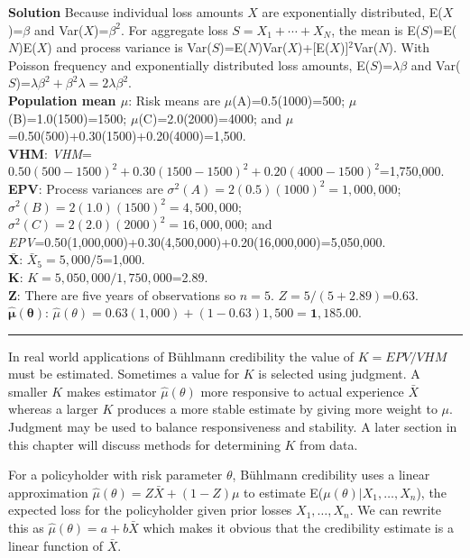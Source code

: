 \documentclass[]{book}
\theoremstyle{definition}
\theoremstyle{definition}
\theoremstyle{definition}
\theoremstyle{remark}
\begin{document}
\hypertarget{toggleExampleCred.3.5}{}
\textbf{Solution} Because individual loss amounts \(X\) are
exponentially distributed, E(\(X\))=\(\beta\) and
Var(\(X\))=\(\beta^2\). For aggregate loss \(S=X_1+\cdots+X_N\), the
mean is E(\(S\))=E(\(N\))E(\(X\)) and process variance is
Var(\(S\))=E(\(N\))Var(\(X\))+{[}E(\(X\)){]}\(^2\)Var(\(N\)). With
Poisson frequency and exponentially distributed loss amounts,
E(\(S\))=\(\lambda\beta\) and
Var(\(S\))=\(\lambda\beta^2+\beta^2\lambda=2\lambda\beta^2\).\\
\textbf{Population mean \(\mu\)}: Risk means are
\(\mu\)(A)=0.5(1000)=500; \(\mu\)(B)=1.0(1500)=1500;
\(\mu\)(C)=2.0(2000)=4000; and
\(\mu\)=0.50(500)+0.30(1500)+0.20(4000)=1,500.\\
\textbf{VHM}:
\emph{VHM}=\(0.50(500-1500)^2+0.30(1500-1500)^2+0.20(4000-1500)^2\)=1,750,000.\\
\textbf{EPV}: Process variances are
\(\sigma^2(A)=2(0.5)(1000)^2=1,000,000\);
\(\sigma^2(B)=2(1.0)(1500)^2=4,500,000\);
\(\sigma^2(C)=2(2.0)(2000)^2=16,000,000\); and
\emph{EPV}=0.50(1,000,000)+0.30(4,500,000)+0.20(16,000,000)=5,050,000.\\
\textbf{\(\mathbf{\bar{X}}\)}: \(\bar{X}_5=5,000/5\)=1,000.\\
\textbf{\(\mathbf{K}\)}: \(K=5,050,000/1,750,000\)=2.89.\\
\textbf{\(\mathbf{Z}\)}: There are five years of observations so
\(n=5\). \(Z=5/(5+2.89)\)=0.63.\\
\textbf{\(\boldsymbol{\hat{\mu}(\theta)}\)}:
\(\hat{\mu}(\theta)=0.63(1,000)+(1-0.63)1,500=\boxed{\mathbf{1,185.00}}\).

\begin{center}\rule{0.5\linewidth}{\linethickness}\end{center}

In real world applications of Bühlmann credibility the value of
\(K=EPV/VHM\) must be estimated. Sometimes a value for \(K\) is selected
using judgment. A smaller \(K\) makes estimator \(\hat{\mu}(\theta)\)
more responsive to actual experience \(\bar{X}\) whereas a larger \(K\)
produces a more stable estimate by giving more weight to \(\mu\).
Judgment may be used to balance responsiveness and stability. A later
section in this chapter will discuss methods for determining \(K\) from
data.

For a policyholder with risk parameter \(\theta\), Bühlmann credibility
uses a linear approximation \(\hat{\mu}(\theta)=Z\bar{X}+(1-Z)\mu\) to
estimate E(\(\mu(\theta)|X_1,\ldots,X_n\)), the expected loss for the
policyholder given prior losses \(X_1,\ldots, X_n\). We can rewrite this
as \(\hat{\mu}(\theta)=a+b\bar{X}\) which makes it obvious that the
credibility estimate is a linear function of \(\bar{X}\).
\end{document}
